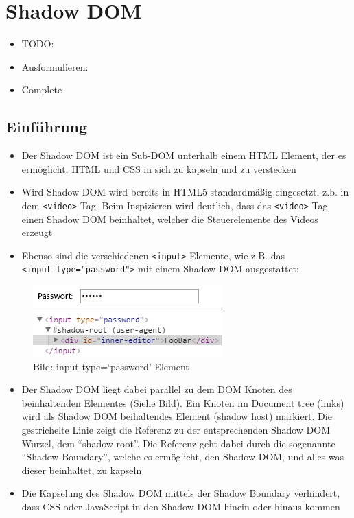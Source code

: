 \section{Shadow DOM}\label{shadow-dom}

\begin{itemize}
\item
  TODO:
\item
  Ausformulieren:
\item
  Complete
\end{itemize}

\subsection{Einführung}\label{einfuxfchrung}

\begin{itemize}
\tightlist
\item
  Der Shadow DOM ist ein Sub-DOM unterhalb einem HTML Element, der es
  ermöglicht, HTML und CSS in sich zu kapseln und zu verstecken
\item
  Wird Shadow DOM wird bereits in HTML5 standardmäßig eingesetzt, z.b.
  in dem \texttt{\textless{}video\textgreater{}} Tag. Beim Inspizieren
  wird deutlich, dass das \texttt{\textless{}video\textgreater{}} Tag
  einen Shadow DOM beinhaltet, welcher die Steuerelemente des Videos
  erzeugt
\item
  Ebenso sind die verschiedenen \texttt{\textless{}input\textgreater{}}
  Elemente, wie z.B. das
  \texttt{\textless{}input\ type="password"\textgreater{}} mit einem
  Shadow-DOM ausgestattet:
\end{itemize}

\begin{figure}[htbp]
\centering
\includegraphics{images/2-shadow-dom-input-type-password.jpg}
\caption{Bild: input type=`password' Element}
\end{figure}

\begin{itemize}
\tightlist
\item
  Der Shadow DOM liegt dabei parallel zu dem DOM Knoten des
  beinhaltenden Elementes (Siehe Bild). Ein Knoten im Document tree
  (links) wird als Shadow DOM beihaltendes Element (shadow host)
  markiert. Die gestrichelte Linie zeigt die Referenz zu der
  entsprechenden Shadow DOM Wurzel, dem ``shadow root''. Die Referenz
  geht dabei durch die sogenannte ``Shadow Boundary'', welche es
  ermöglicht, den Shadow DOM, und alles was dieser beinhaltet, zu
  kapseln
\item
  Die Kapselung des Shadow DOM mittels der Shadow Boundary verhindert,
  dass CSS oder JavaScript in den Shadow DOM hinein oder hinaus kommen
\end{itemize}


